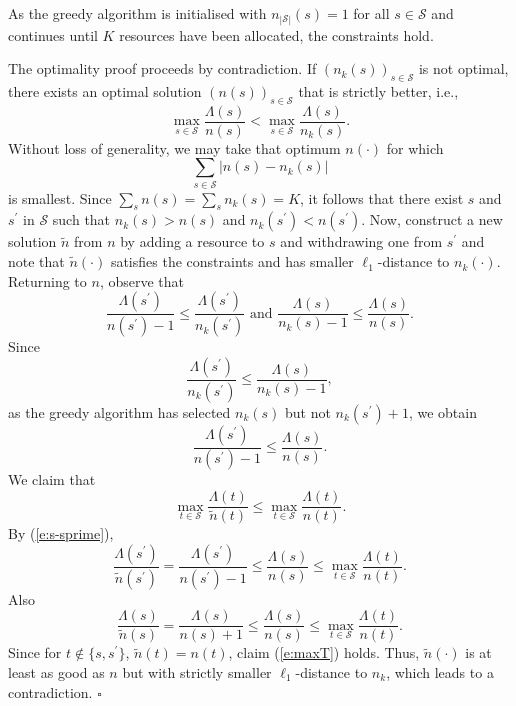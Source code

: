 \documentclass[twoside,11pt]{article}
\newenvironment{proof}[1]{\noindent{\em Proof{#1}:}}{\hfill $\square$ \\}
\begin{document}
\begin{proof}{}
As the greedy algorithm is initialised with $n_{|\mathcal{S}|}(s) 
= 1$ for all $s\in\mathcal{S}$ and continues until $K$ resources 
have been allocated, the constraints hold. 

The optimality proof proceeds by contradiction. If 
$(n_k(s))_{s\in\mathcal{S}}$ is not optimal, there exists an optimal 
solution $(n(s))_{s\in\mathcal{S}}$ that is strictly better, i.e.,
\[
    \max_{s\in\mathcal{S}} \frac{\Lambda(s)}{n(s)}
    < \max_{s\in\mathcal{S}} \frac{\Lambda(s)}{n_k(s)}.
\]
Without loss of generality, we may take that optimum 
$n(\cdot)$ for which
\[
\sum_{s\in\mathcal{S}} |n(s) - n_k(s)|
\]
is smallest. Since 
$\sum_s n(s) = \sum_s n_k(s) = K$, 
it follows that there exist $s$ and $s^\prime$ in 
$\mathcal{S}$ such that $n_k(s) > n(s)$ and 
$n_k(s^\prime) < n(s^\prime)$.  Now, construct a new solution 
$\tilde n$ from $n$ by adding a resource to $s$ and withdrawing 
one from $s^\prime$ and note that $\tilde n(\cdot)$ satisfies the 
constraints and has smaller $\ell_1$-distance to $n_k(\cdot)$. 
Returning to $n$, observe that
\[
\frac{\Lambda(s^\prime)}{n(s^\prime)-1} \leq 
\frac{\Lambda(s^\prime)}{n_k(s^\prime)}
\mbox{ and }
\frac{\Lambda(s)}{n_k(s)-1} \leq \frac{\Lambda(s)}{n(s)}.
\]
Since 
\[
\frac{\Lambda(s^\prime)}{n_k(s^\prime)} \leq 
\frac{\Lambda(s)}{n_k(s)-1},
\]
as  the greedy algorithm has selected $n_k(s)$ but not
$n_k(s^\prime) + 1 $,  we obtain
\begin{equation}
\frac{\Lambda(s^\prime)}{n(s^\prime)-1} \leq
\frac{\Lambda(s)}{n(s)}. 
\label{e:s-sprime}
\end{equation}
We claim that 
\begin{equation}
\max_{t\in\mathcal{S}} \frac{\Lambda(t)}{\tilde n(t)}
\leq \max_{t \in \mathcal{S} } \frac{\Lambda(t)}{n(t)}.
\label{e:maxT}
\end{equation}
By (\ref{e:s-sprime}), 
\[
\frac{\Lambda(s^\prime)}{\tilde n(s^\prime)}=
\frac{\Lambda(s^\prime)}{n(s^\prime)-1} \leq
\frac{\Lambda(s)}{n(s)} \leq \max_{t\in\mathcal{S}} \frac{\Lambda(t)}{n(t)}.
\]
Also
\[
\frac{\Lambda(s)}{\tilde n(s)} = \frac{\Lambda(s)}{n(s)+1} \leq
\frac{\Lambda(s)}{n(s)} \leq  \max_{t \in \mathcal{S}} \frac{\Lambda(t)}{n(t)}.
\]
Since for $t \not \in \{ s, s^\prime \}$, $\tilde n(t) = n(t)$,
claim (\ref{e:maxT}) holds. Thus, $\tilde n(\cdot)$ is at least as good 
as $n$ but with strictly smaller $\ell_1$-distance to $n_k$, which 
leads to a contradiction.
\end{proof}
\end{document}

